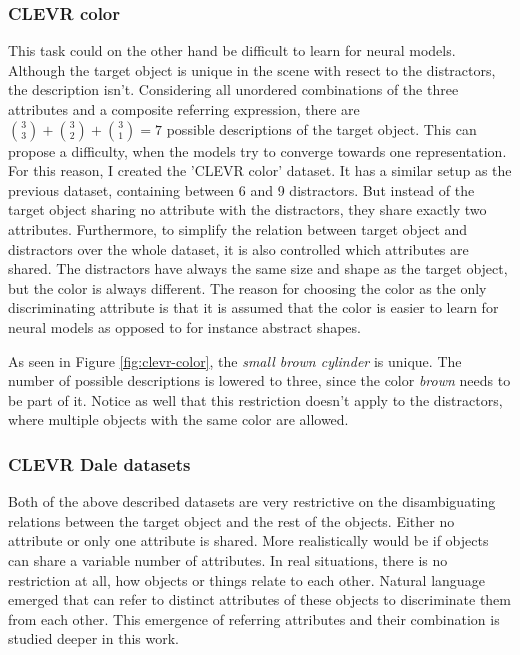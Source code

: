 \subsubsection{CLEVR color}
This task could on the other hand be difficult to learn for neural models.
Although the target object is unique in the scene with resect to the distractors, the description isn't.
Considering all unordered combinations of the three attributes and a composite referring expression, there are $\binom{3}{3} + \binom{3}{2} + \binom{3}{1} = 7$ possible descriptions of the target object.
This can propose a difficulty, when the models try to converge towards one representation.
For this reason, I created the 'CLEVR color' dataset.
It has a similar setup as the previous dataset, containing between 6 and 9 distractors.
But instead of the target object sharing no attribute with the distractors, they share exactly two attributes.
Furthermore, to simplify the relation between target object and distractors over the whole dataset, it is also controlled which attributes are shared.
The distractors have always the same size and shape as the target object, but the color is always different.
The reason for choosing the color as the only discriminating attribute is that it is assumed that the color is easier to learn for neural models as opposed to for instance abstract shapes.

As seen in Figure \ref{fig:clevr-color}, the \emph{small brown cylinder} is unique.
The number of possible descriptions is lowered to three, since the color \emph{brown} needs to be part of it.
Notice as well that this restriction doesn't apply to the distractors, where multiple objects with the same color are allowed.

\subsubsection{CLEVR Dale datasets}
Both of the above described datasets are very restrictive on the disambiguating relations between the target object and the rest of the objects.
Either no attribute or only one attribute is shared.
More realistically would be if objects can share a variable number of attributes.
In real situations, there is no restriction at all, how objects or things relate to each other.
Natural language emerged that can refer to distinct attributes of these objects to discriminate them from each other.
This emergence of referring attributes and their combination is studied deeper in this work.

